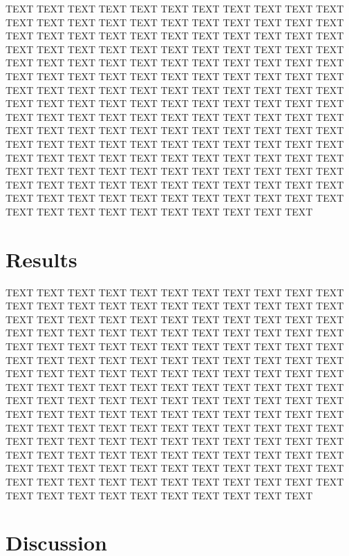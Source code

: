 \documentclass{article}
\begin{document}
TEXT TEXT TEXT TEXT TEXT TEXT TEXT TEXT TEXT TEXT TEXT TEXT TEXT TEXT TEXT TEXT TEXT TEXT TEXT TEXT TEXT TEXT TEXT TEXT TEXT TEXT TEXT TEXT TEXT TEXT TEXT TEXT TEXT TEXT TEXT TEXT TEXT TEXT TEXT TEXT TEXT TEXT TEXT TEXT TEXT TEXT TEXT TEXT TEXT TEXT TEXT TEXT TEXT TEXT TEXT TEXT TEXT TEXT TEXT TEXT TEXT TEXT TEXT TEXT TEXT TEXT TEXT TEXT TEXT TEXT TEXT TEXT TEXT TEXT TEXT TEXT TEXT TEXT TEXT TEXT TEXT TEXT TEXT TEXT TEXT TEXT TEXT TEXT TEXT TEXT TEXT TEXT TEXT TEXT TEXT TEXT TEXT TEXT TEXT TEXT TEXT TEXT TEXT TEXT TEXT TEXT TEXT TEXT TEXT TEXT TEXT TEXT TEXT TEXT TEXT TEXT TEXT TEXT TEXT TEXT TEXT TEXT TEXT TEXT TEXT TEXT TEXT TEXT TEXT TEXT TEXT TEXT TEXT TEXT TEXT TEXT TEXT TEXT TEXT TEXT TEXT TEXT TEXT TEXT TEXT TEXT TEXT TEXT TEXT TEXT TEXT TEXT TEXT TEXT TEXT TEXT TEXT TEXT TEXT TEXT TEXT TEXT TEXT TEXT TEXT TEXT TEXT TEXT TEXT TEXT TEXT TEXT TEXT TEXT TEXT 


\section{Results}

TEXT TEXT TEXT TEXT TEXT TEXT TEXT TEXT TEXT TEXT TEXT TEXT TEXT TEXT TEXT TEXT TEXT TEXT TEXT TEXT TEXT TEXT TEXT TEXT TEXT TEXT TEXT TEXT TEXT TEXT TEXT TEXT TEXT TEXT TEXT TEXT TEXT TEXT TEXT TEXT TEXT TEXT TEXT TEXT TEXT TEXT TEXT TEXT TEXT TEXT TEXT TEXT TEXT TEXT TEXT TEXT TEXT TEXT TEXT TEXT TEXT TEXT TEXT TEXT TEXT TEXT TEXT TEXT TEXT TEXT TEXT TEXT TEXT TEXT TEXT TEXT TEXT TEXT TEXT TEXT TEXT TEXT TEXT TEXT TEXT TEXT TEXT TEXT TEXT TEXT TEXT TEXT TEXT TEXT TEXT TEXT TEXT TEXT TEXT TEXT TEXT TEXT TEXT TEXT TEXT TEXT TEXT TEXT TEXT TEXT TEXT TEXT TEXT TEXT TEXT TEXT TEXT TEXT TEXT TEXT TEXT TEXT TEXT TEXT TEXT TEXT TEXT TEXT TEXT TEXT TEXT TEXT TEXT TEXT TEXT TEXT TEXT TEXT TEXT TEXT TEXT TEXT TEXT TEXT TEXT TEXT TEXT TEXT TEXT TEXT TEXT TEXT TEXT TEXT TEXT TEXT TEXT TEXT TEXT TEXT TEXT TEXT TEXT TEXT TEXT TEXT TEXT TEXT TEXT TEXT TEXT TEXT TEXT TEXT TEXT 

\section{Discussion}
\end{document}
